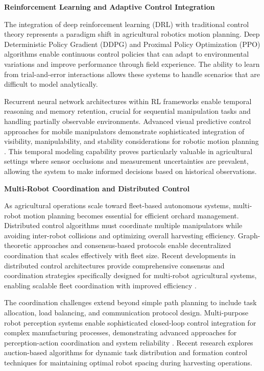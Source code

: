 \documentclass[a4paper,fleqn]{cas-dc}
\begin{document}
\textbf{Reinforcement Learning and Adaptive Control Integration}

The integration of deep reinforcement learning (DRL) with traditional control theory represents a paradigm shift in agricultural robotics motion planning. Deep Deterministic Policy Gradient (DDPG) and Proximal Policy Optimization (PPO) algorithms enable continuous control policies that can adapt to environmental variations and improve performance through field experience. The ability to learn from trial-and-error interactions allows these systems to handle scenarios that are difficult to model analytically.

Recurrent neural network architectures within RL frameworks enable temporal reasoning and memory retention, crucial for sequential manipulation tasks and handling partially observable environments. Advanced visual predictive control approaches for mobile manipulators demonstrate sophisticated integration of visibility, manipulability, and stability considerations for robotic motion planning \cite{BILDSTEIN2024104754}. This temporal modeling capability proves particularly valuable in agricultural settings where sensor occlusions and measurement uncertainties are prevalent, allowing the system to make informed decisions based on historical observations.

\textbf{Multi-Robot Coordination and Distributed Control}

As agricultural operations scale toward fleet-based autonomous systems, multi-robot motion planning becomes essential for efficient orchard management. Distributed control algorithms must coordinate multiple manipulators while avoiding inter-robot collisions and optimizing overall harvesting efficiency. Graph-theoretic approaches and consensus-based protocols enable decentralized coordination that scales effectively with fleet size. Recent developments in distributed control architectures provide comprehensive consensus and coordination strategies specifically designed for multi-robot agricultural systems, enabling scalable fleet coordination with improved efficiency .

The coordination challenges extend beyond simple path planning to include task allocation, load balancing, and communication protocol design. Multi-purpose robot perception systems enable sophisticated closed-loop control integration for complex manufacturing processes, demonstrating advanced approaches for perception-action coordination and system reliability \cite{PREZAS2024104778}. Recent research explores auction-based algorithms for dynamic task distribution and formation control techniques for maintaining optimal robot spacing during harvesting operations.
\end{document}
